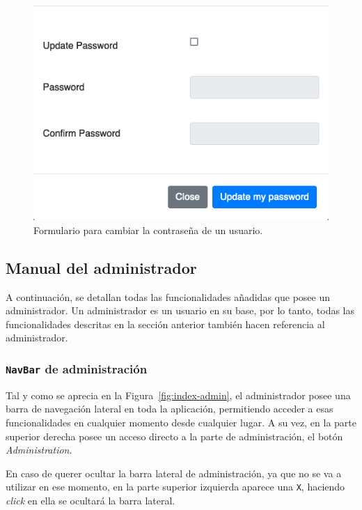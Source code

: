 \begin{figure}
\centering
\includegraphics[scale=0.5]{../img/anexos/manual-usuario/UBUMLaaS/edit-profile-passwd}
\caption{Formulario para cambiar la contraseña de un usuario.}\label{fig:edit-profile-passwd}
\end{figure}

\FloatBarrier
\subsection{Manual del administrador}
A continuación, se detallan todas las funcionalidades añadidas que posee un administrador. Un administrador es un usuario en su base, por lo tanto, todas las funcionalidades descritas en la sección anterior también hacen referencia al administrador.

\subsubsection{\texttt{NavBar} de administración}
Tal y como se aprecia en la Figura~\ref{fig:index-admin}, el administrador posee una barra de navegación lateral en toda la aplicación, permitiendo acceder a esas funcionalidades en cualquier momento desde cualquier lugar. A su vez, en la parte superior derecha posee un acceso directo a la parte de administración, el botón \textit{Administration}.

En caso de querer ocultar la barra lateral de administración, ya que no se va a utilizar en ese momento, en la parte superior izquierda aparece una \texttt{X}, haciendo \textit{click} en ella se ocultará la barra lateral.


